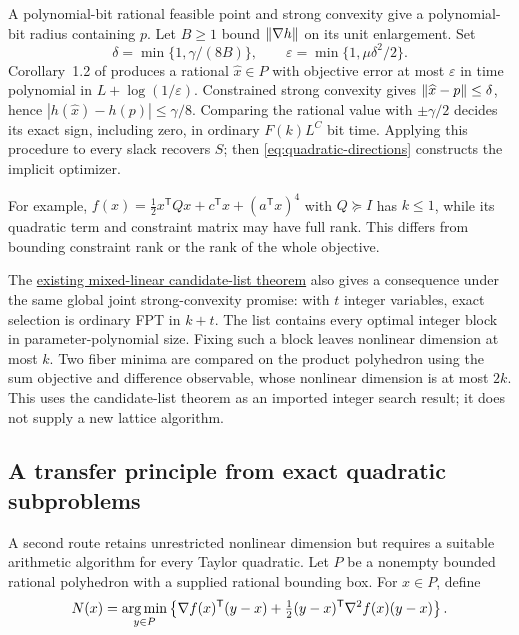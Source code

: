 A polynomial-bit rational feasible point and strong convexity give a
polynomial-bit radius containing $p$. Let $B\ge1$ bound
$\left\lVert\nabla h\right\rVert$ on its unit enlargement. Set
\[
 \delta=\min\{1,\gamma/(8B)\},\qquad
 \varepsilon=\min\{1,\mu\delta^2/2\}.
\]
Corollary~1.2 of \citet{SlotSteurerWiedmer2025} produces a rational
$\widehat x\in P$ with objective error at most $\varepsilon$ in time
polynomial in $L+\log(1/\varepsilon)$. Constrained strong convexity gives
$\left\lVert\widehat x-p\right\rVert\le\delta$, hence
$|h(\widehat x)-h(p)|\le\gamma/8$. Comparing the rational value with
$\pm\gamma/2$ decides its exact sign, including zero, in ordinary
$F(k)L^C$ bit time. Applying this procedure to every slack recovers $S$;
then \eqref{eq:quadratic-directions} constructs the implicit optimizer.

For example, $f(x)=\tfrac12x^{\mathsf T}Qx+c^{\mathsf T}x+(a^{\mathsf T}x)^4$
with $Q\succeq I$ has $k\le1$, while its quadratic term and constraint
matrix may have full rank. This differs from bounding constraint rank
or the rank of the whole objective.

The
\href{../../research-20260927/mixed-linear-strong-quartic-candidate-list.md}{existing mixed-linear candidate-list theorem}
also gives a consequence under the same global joint strong-convexity
promise: with $t$ integer variables, exact selection is ordinary FPT in
$k+t$. The list contains every optimal integer block in
parameter-polynomial size. Fixing such a block leaves nonlinear dimension
at most $k$. Two fiber minima are compared on the product polyhedron using
the sum objective and difference observable, whose nonlinear dimension is
at most $2k$. This uses the candidate-list theorem as an imported integer
search result; it does not supply a new lattice algorithm.

\subsection{A transfer principle from exact quadratic subproblems}

A second route retains unrestricted nonlinear dimension but requires a
suitable arithmetic algorithm for every Taylor quadratic. Let $P$ be a
nonempty bounded rational polyhedron with a supplied rational bounding box.
For $x\in P$, define
\begin{equation}
 N(x)=\operatorname*{arg\,min}_{y\in P}
 \left\{\nabla f(x)^{\mathsf T}(y-x)
 +\tfrac12(y-x)^{\mathsf T}\nabla^2f(x)(y-x)\right\}.
 \label{eq:constrained-newton}
\end{equation}

